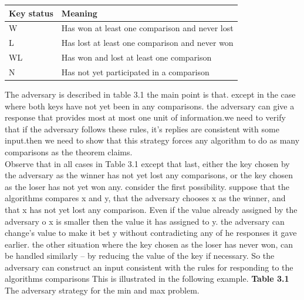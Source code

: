 \documentclass[a4paper,10pt,titlepage]{report}
\begin{document}
\begin{center}
\begin{tabular}{ll}
Key status & Meaning                                        \\ \hline
W          & Has won at least one comparison and never lost \\
L          & Has lost at least one comparison and never won \\
WL         & Has won and lost at least one comparison       \\
N          & Has not yet participated in a comparison       \\ \hline
\end{tabular}
\end{center}
\vspace{5mm}
The adversary is described in table 3.1 the main point is that. except in the case where both keys have not yet been in any comparisons. the adversary can give a response that provides most at most one unit of information.we need to verify that if the adversary follows these rules, it's replies are consistent with some input.then we need to show that this strategy forces any algorithm to do as many comparisons as the theorem claims.\\
Observe that in all cases in Table 3.1 except that last, either the key chosen by the adversary as the winner has not yet lost any comparisons, or the key chosen as the loser has not yet won any. consider the first possibility. suppose that the algorithms compares x and y, that the adversary chooses x as the winner, and that x has not yet lost any comparison. Even if the value already assigned by the adversary o x is smaller then the value it has assigned to y. the adversary can change's value to make it bet y without contradicting any of he responses it gave earlier. the other situation where the key chosen as the loser has never won, can be handled similarly -- by reducing the value of the key if necessary. So the adversary can construct an input consistent with the rules for responding to the algorithms comparisons This is illustrated in the following example.
\vspace{5mm}
\textbf{Table 3.1}\\
The adversary strategy for the min and max problem.
\end{document}
